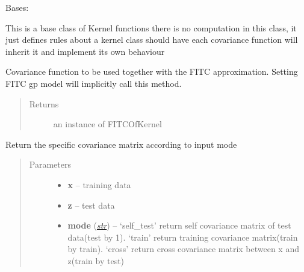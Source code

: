 \documentclass[letterpaper,10pt,english]{sphinxmanual}
\begin{document}
\begin{fulllineitems}
\label{pyGPs.Core:pyGPs.Core.cov.Kernel}
Bases: 

This is a base class of Kernel functions
there is no computation in this class, it just defines rules about a kernel class should have
each covariance function will inherit it and implement its own behaviour

\begin{fulllineitems}
\label{pyGPs.Core:pyGPs.Core.cov.Kernel.fitc}
Covariance function to be used together with the FITC approximation.
Setting FITC gp model will implicitly call this method.
\begin{quote}\begin{description}
\item[{Returns}] \leavevmode
an instance of FITCOfKernel

\end{description}\end{quote}

\end{fulllineitems}


\begin{fulllineitems}
\label{pyGPs.Core:pyGPs.Core.cov.Kernel.getCovMatrix}
Return the specific covariance matrix according to input mode
\begin{quote}\begin{description}
\item[{Parameters}] \leavevmode\begin{itemize}
\item {} 
\textbf{x} -- training data

\item {} 
\textbf{z} -- test data

\item {} 
\textbf{mode} (\href{http://docs.python.org/library/functions.html\#str}{\emph{str}}) -- `self\_test' return self covariance matrix of test data(test by 1). 
`train' return training covariance matrix(train by train).
`cross' return cross covariance matrix between x and z(train by test)

\end{itemize}


\end{description}
\end{quote}
\end{fulllineitems}
\end{fulllineitems}
\end{document}
